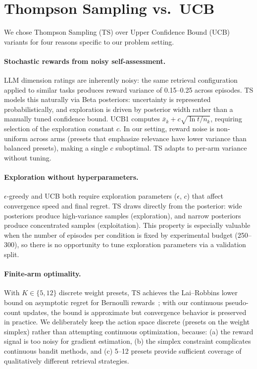 \section{Thompson Sampling vs.\ UCB}
\label{app:ts_vs_ucb}

We chose Thompson Sampling (TS) over Upper Confidence Bound (UCB) variants for four reasons specific to our problem setting.

\paragraph{Stochastic rewards from noisy self-assessment.}
LLM dimension ratings are inherently noisy: the same retrieval configuration applied to similar tasks produces reward variance of 0.15--0.25 across episodes.
TS models this naturally via Beta posteriors: uncertainty is represented probabilistically, and exploration is driven by posterior width rather than a manually tuned confidence bound.
UCB1 computes $\bar{x}_k + c\sqrt{\ln t / n_k}$, requiring selection of the exploration constant $c$.
In our setting, reward noise is non-uniform across arms (presets that emphasize relevance have lower variance than balanced presets), making a single $c$ suboptimal.
TS adapts to per-arm variance without tuning.

\paragraph{Exploration without hyperparameters.}
$\epsilon$-greedy and UCB both require exploration parameters ($\epsilon$, $c$) that affect convergence speed and final regret.
TS draws directly from the posterior: wide posteriors produce high-variance samples (exploration), and narrow posteriors produce concentrated samples (exploitation).
This property is especially valuable when the number of episodes per condition is fixed by experimental budget (250--300), so there is no opportunity to tune exploration parameters via a validation split.

\paragraph{Finite-arm optimality.}
With $K \in \{5, 12\}$ discrete weight presets, TS achieves the Lai--Robbins lower bound on asymptotic regret for Bernoulli rewards~\citep{agrawal2012analysis}; with our continuous pseudo-count updates, the bound is approximate but convergence behavior is preserved in practice.
We deliberately keep the action space discrete (presets on the weight simplex) rather than attempting continuous optimization, because: (a) the reward signal is too noisy for gradient estimation, (b) the simplex constraint complicates continuous bandit methods, and (c) 5--12 presets provide sufficient coverage of qualitatively different retrieval strategies.


